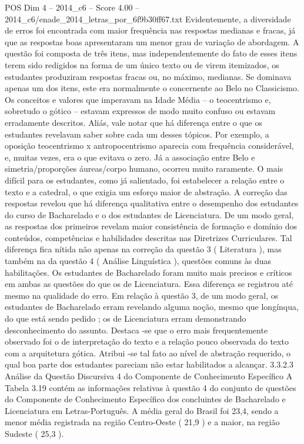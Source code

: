 \begin{textsample}{POS Dim 4 – 2014\_c6 – Score 4.00 – 2014\_c6/enade\_2014\_letras\_por\_6f9b30ff67.txt}
Evidentemente, a diversidade de erros foi encontrada com maior frequência nas respostas medianas e fracas, já que as respostas boas apresentaram um menor grau de variação de abordagem.
A questão foi composta de três itens, mas independentemente do fato de esses itens terem sido redigidos na forma de um único texto ou de virem itemizados, os estudantes produziram respostas fracas ou, no máximo, medianas.
Se dominava apenas um dos itens, este era normalmente o concernente ao Belo no Classicismo.
Os conceitos e valores que imperavam na Idade Média – o teocentrismo e, sobretudo o gótico – estavam expressos de modo muito confuso ou estavam erradamente descritos.
Aliás, vale notar que há diferença entre o que os estudantes revelavam saber sobre cada um desses tópicos.
Por exemplo, a oposição teocentrismo x antropocentrismo aparecia com frequência considerável, e, muitas vezes, era o que evitava o zero.
Já a associação entre Belo e simetria/proporções áureas/corpo humano, ocorreu muito raramente.
O mais difícil para os estudantes, como já salientado, foi estabelecer a relação entre o texto e a catedral, o que exigia um esforço maior de abstração.
A correção das respostas revelou que há diferença qualitativa entre o desempenho dos estudantes do curso de Bacharelado e o dos estudantes de Licenciatura.
De um modo geral, as respostas dos primeiros revelam maior consistência de formação e domínio dos conteúdos, competências e habilidades descritas nas Diretrizes Curriculares.
Tal diferença fica nítida não apenas na correção da questão 3 ( Literatura ), mas também na da questão 4 ( Análise Linguística ), questões comuns às duas habilitações.
Os estudantes de Bacharelado foram muito mais precisos e críticos em ambas as questões do que os de Licenciatura.
Essa diferença se registrou até mesmo na qualidade do erro.
Em relação à questão 3, de um modo geral, os estudantes de Bacharelado erram revelando alguma noção, mesmo que longínqua, do que está sendo pedido ; os de Licenciatura erram demonstrando desconhecimento do assunto.
Destaca -se que o erro mais frequentemente observado foi o de interpretação do texto e a relação pouco observada do texto com a arquitetura gótica.
Atribui -se tal fato ao nível de abstração requerido, o qual boa parte dos estudantes pareciam não estar habilitados a alcançar. 3.3.2.3 Análise da Questão Discursiva 4 do Componente de Conhecimento Específico A Tabela 3.19 contém as informações relativas à questão 4 do conjunto de questões do Componente de Conhecimento Específico dos concluintes de Bacharelado e Licenciatura em Letras-Português.
A média geral do Brasil foi 23,4, sendo a menor média registrada na região Centro-Oeste ( 21,9 ) e a maior, na região Sudeste ( 25,3 ).

\end{textsample}
